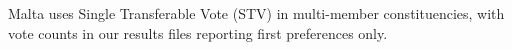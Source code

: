 Malta uses Single Transferable Vote (STV) in multi-member constituencies,
with vote counts in our results files reporting first preferences only.